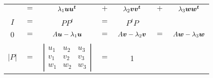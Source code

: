 \documentclass{article}
\newcommand{\bm}[1]{\mbox{\boldmath$#1$}}
\begin{document}
\begin{tabular}{ccccccc}
\\
& $=$ &
$\lambda_1\bm{uu^t}$
& $+$ &
$\lambda_2\bm{vv^t}$
& $+$ &
$\lambda_3\bm{ww^t}$
\\
\\
$I$
& $=$ &
$PP^t$
& $=$ &
$P^tP$
\\
\\
$0$
& $=$ &
$A\bm{u}-\lambda_1\bm{u}$
& $=$ &
$A\bm{v}-\lambda_2\bm{v}$
& $=$ &
$A\bm{w}-\lambda_3\bm{w}$
\\
\\
$|P|$
& $=$ &
$
\left|\begin{array}{ccc}
 u_1 & u_2 & u_3 \\
 v_1 & v_2 & v_3 \\
 w_1 & w_2 & w_3
\end{array}\right|
$
& $=$ &
1
\end{tabular}


\end{document}
